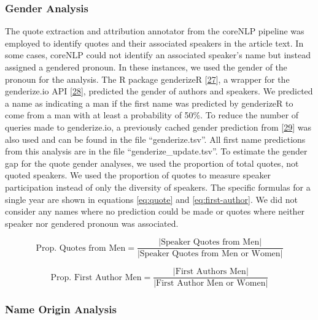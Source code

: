 \hypertarget{gender-analysis}{%
\subsubsection{Gender Analysis}\label{gender-analysis}}

The quote extraction and attribution annotator from the coreNLP pipeline was employed to identify quotes and their associated speakers in the article text.
In some cases, coreNLP could not identify an associated speaker's name but instead assigned a gendered pronoun.
In these instances, we used the gender of the pronoun for the analysis.
The R package genderizeR {[}\protect\hyperlink{ref-cLM5pKQN}{27}{]}, a wrapper for the genderize.io API {[}\protect\hyperlink{ref-15Jxi2IvD}{28}{]}, predicted the gender of authors and speakers.
We predicted a name as indicating a man if the first name was predicted by genderizeR to come from a man with at least a probability of 50\%.
To reduce the number of queries made to genderize.io, a previously cached gender prediction from {[}\protect\hyperlink{ref-b1Ltmp3Z}{29}{]} was also used and can be found in the file ``genderize.tsv''.
All first name predictions from this analysis are in the file ``genderize\_update.tsv''.
To estimate the gender gap for the quote gender analyses, we used the proportion of total quotes, not quoted speakers.
We used the proportion of quotes to measure speaker participation instead of only the diversity of speakers.
The specific formulas for a single year are shown in equations \ref{eq:quote} and \ref{eq:first-author}.
We did not consider any names where no prediction could be made or quotes where neither speaker nor gendered pronoun was associated.

\begin{equation}\textrm{Prop. Quotes from Men} = \frac{|\textrm{Speaker Quotes from Men}|} {|\textrm{Speaker Quotes from Men or Women}|}\label{eq:quote}\end{equation}

\begin{equation}\textrm{Prop. First Author Men} = \frac{|\textrm{First Authors Men}|} {|\textrm{First Author Men or Women}|}\label{eq:first-author}\end{equation}

\hypertarget{name-origin-analysis}{%
\subsubsection{Name Origin Analysis}\label{name-origin-analysis}}

